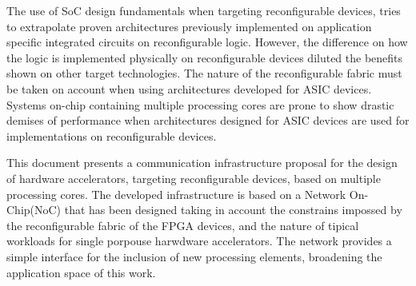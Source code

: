 The use of SoC design fundamentals when targeting reconfigurable devices, tries to extrapolate proven architectures previously implemented on application specific integrated circuits on reconfigurable logic. However, the difference on how the logic is implemented physically on reconfigurable devices diluted the benefits shown on other target technologies. The nature of the reconfigurable fabric must be taken on account when using architectures developed for ASIC devices. Systems on-chip containing multiple processing cores are prone to show drastic demises of performance when architectures designed for ASIC devices are used for implementations on reconfigurable devices.

This document presents a communication infrastructure proposal for the design of hardware accelerators, targeting reconfigurable devices, based on multiple processing cores. The developed infrastructure is based on a Network On-Chip(NoC) that has been designed taking in account the constrains impossed by the reconfigurable fabric of the FPGA devices, and the nature of tipical workloads for single porpouse harwdware accelerators. The network provides a simple interface for the inclusion of new processing elements, broadening the application space of this work.